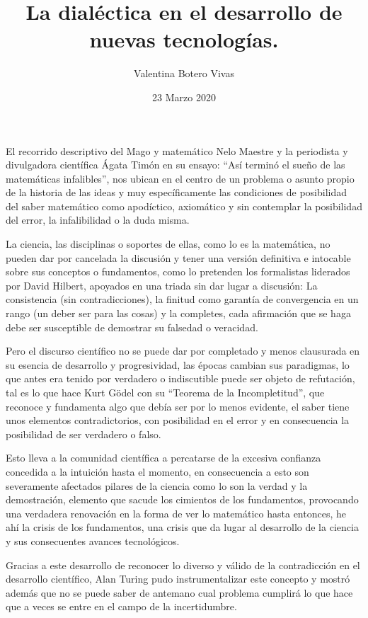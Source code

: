 \documentclass{report}
\title{La dialéctica en el desarrollo de nuevas tecnologías.}
\author{Valentina Botero Vivas }
\date{23 Marzo 2020}
\begin{document}
\maketitle

El recorrido descriptivo del Mago y matemático Nelo Maestre y la periodista y divulgadora científica Ágata Timón en su ensayo: “Así terminó el sueño de las matemáticas infalibles”, nos ubican en el centro de un problema o asunto propio de la historia de las ideas y muy específicamente las condiciones de posibilidad del saber matemático como apodíctico, axiomático y sin contemplar la posibilidad del error, la infalibilidad o la duda misma.  

La ciencia, las disciplinas o soportes de ellas, como lo es la matemática, no pueden dar por cancelada la discusión y tener una versión definitiva e intocable sobre sus conceptos o fundamentos, como lo pretenden los formalistas liderados por David Hilbert, apoyados en una triada sin dar lugar a discusión: La consistencia (sin contradicciones), la finitud como garantía de convergencia en un rango (un deber ser para las cosas) y la completes, cada afirmación que se haga debe ser susceptible de demostrar su falsedad o veracidad. 

Pero el discurso científico no se puede dar por completado y menos clausurada en su esencia de desarrollo y progresividad, las épocas cambian sus paradigmas, lo que antes era tenido por verdadero o indiscutible puede ser objeto de refutación, tal es lo que hace Kurt Gödel con su “Teorema de la Incompletitud”, que reconoce y fundamenta algo que debía ser  por lo menos evidente, el saber tiene unos elementos contradictorios, con posibilidad en el error y en consecuencia la posibilidad de ser verdadero o falso. 

Esto lleva a la comunidad científica a percatarse de la excesiva confianza concedida a la intuición hasta el momento, en consecuencia a esto son severamente afectados pilares de la ciencia como lo son la verdad y la demostración, elemento que sacude los cimientos de los fundamentos, provocando una verdadera renovación en la forma de ver lo matemático hasta entonces, he ahí la crisis de los fundamentos, una crisis que da lugar al desarrollo de la  ciencia y sus consecuentes avances tecnológicos. 

Gracias a este desarrollo de reconocer lo diverso y válido de la contradicción en el desarrollo científico, Alan Turing pudo instrumentalizar este concepto y mostró además que no se puede saber de antemano cual problema cumplirá lo que hace que a veces se entre en el campo de la incertidumbre.
\end{document}
